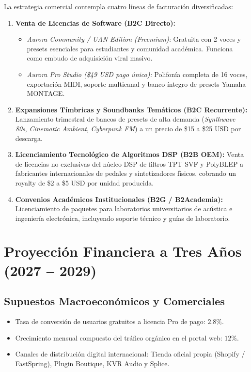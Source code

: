 \documentclass[11pt,a4paper]{article}
\begin{document}
La estrategia comercial contempla cuatro líneas de facturación diversificadas:

\begin{enumerate}[leftmargin=1.5cm]
    \item \textbf{Venta de Licencias de Software (B2C Directo):}
    \begin{itemize}
        \item \textit{Aurora Community / UAN Edition (Freemium):} Gratuita con 2 voces y presets esenciales para estudiantes y comunidad académica. Funciona como embudo de adquisición viral masivo.
        \item \textit{Aurora Pro Studio (\$49 USD pago único):} Polifonía completa de 16 voces, exportación MIDI, soporte multicanal y banco íntegro de presets Yamaha MONTAGE.
    \end{itemize}
    \item \textbf{Expansiones Tímbricas y Soundbanks Temáticos (B2C Recurrente):}
    Lanzamiento trimestral de bancos de presets de alta demanda (\textit{Synthwave 80s}, \textit{Cinematic Ambient}, \textit{Cyberpunk FM}) a un precio de \$15 a \$25 USD por descarga.
    \item \textbf{Licenciamiento Tecnológico de Algoritmos DSP (B2B OEM):}
    Venta de licencias no exclusivas del núcleo DSP de filtros TPT SVF y PolyBLEP a fabricantes internacionales de pedales y sintetizadores físicos, cobrando un royalty de \$2 a \$5 USD por unidad producida.
    \item \textbf{Convenios Académicos Institucionales (B2G / B2Academia):}
    Licenciamiento de paquetes para laboratorios universitarios de acústica e ingeniería electrónica, incluyendo soporte técnico y guías de laboratorio.
\end{enumerate}

\section{Proyección Financiera a Tres Años (2027 -- 2029)}

\subsection{Supuestos Macroeconómicos y Comerciales}
\begin{itemize}[leftmargin=1.5cm]
    \item Tasa de conversión de usuarios gratuitos a licencia Pro de pago: $2.8\%$.
    \item Crecimiento mensual compuesto del tráfico orgánico en el portal web: $12\%$.
    \item Canales de distribución digital internacional: Tienda oficial propia (Shopify / FastSpring), Plugin Boutique, KVR Audio y Splice.
\end{itemize}
\end{document}

